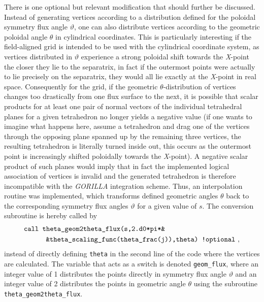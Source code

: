 \documentclass[./main.tex]{subfiles}
\begin{document}
There is one optional but relevant modification that should further be discussed. Instead of generating vertices according to a distribution defined for the poloidal symmetry flux angle $\vartheta$, one can also distribute vertices according to the geometric poloidal angle $\theta$ in cylindrical coordinates. This is particularly interesting if the field-aligned grid is intended to be used with the cylindrical coordinate system, as vertices distributed in $\vartheta$ experience a strong poloidal shift towards the \textit{X}-point the closer they lie to the separatrix, in fact if the outermost points were actually to lie precisely on the separatrix, they would all lie exactly at the \textit{X}-point in real space. Consequently for the grid, if the geometric $\theta$-distribution of vertices changes too drastically from one flux surface to the next, it is possible that scalar products for at least one pair of normal vectors of the individual tetrahedral planes for a given tetrahedron no longer yields a negative value (if one wants to imagine what happens here, assume a tetrahedron and drag one of the vertices through the opposing plane spanned up by the remaining three vertices, the resulting tetrahedron is literally turned inside out, this occurs as the outermost point is increasingly shifted poloidally towards the \textit{X}-point). A negative scalar product of such planes would imply that in fact the implemented logical association of vertices is invalid and the generated tetrahedron is therefore incompatible with the \textit{GORILLA} integration scheme. Thus, an interpolation routine was implemented, which transforms defined geometric angles $\theta$ back to the corresponding symmetry flux angles $\vartheta$ for a given value of $s$. The conversion subroutine is hereby called by
\begin{align*}
&\texttt{call theta\_geom2theta\_flux(s,2.d0*pi*\&}\\
&\hspace{1.1cm}\texttt{\&theta\_scaling\_func(theta\_frac(j)),theta) !optional}~,
\end{align*}
instead of directly defining \texttt{theta} in the second line of the code where the vertices are calculated. The variable that acts as a switch is denoted \texttt{geom\_flux}, where an integer value of 1 distributes the points directly in symmetry flux angle $\vartheta$ and an integer value of 2 distributes the points in geometric angle $\theta$ using the subroutine \texttt{theta\_geom2theta\_flux}.
\end{document}
